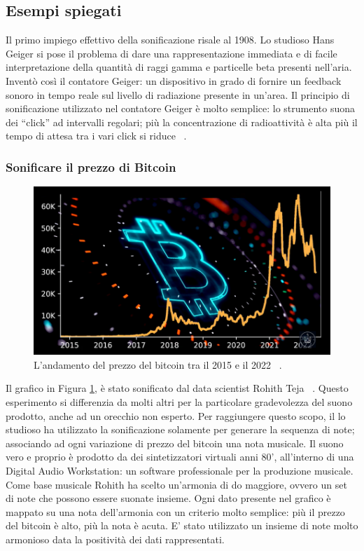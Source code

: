 \subsection{Esempi spiegati}
Il primo impiego effettivo della sonificazione risale al 1908. Lo studioso Hans Geiger si pose il problema di dare una rappresentazione immediata e di facile interpretazione della quantità di raggi gamma e particelle beta presenti nell’aria.
Inventò così il contatore Geiger: un dispositivo in grado di fornire un feedback sonoro in tempo reale sul livello di radiazione presente in un’area.
Il principio di sonificazione utilizzato nel contatore Geiger è molto semplice: lo strumento suona dei “click” ad intervalli regolari; più la concentrazione di radioattività è alta più il tempo di attesa tra i vari click si riduce ~\cite{soni_temporal}.

\subsubsection{Sonificare il prezzo di Bitcoin}
\begin{figure}[H]
  \includegraphics[width=\linewidth]{img/btc.PNG}
  \caption{L'andamento del prezzo del bitcoin tra il 2015 e il 2022 ~\cite{bitcoin}.}
  \label{fig:btc}
\end{figure}
Il grafico in Figura \ref{fig:btc}, è stato sonificato dal data scientist Rohith Teja  ~\cite{bitcoin}.
Questo esperimento si differenzia da molti altri per la particolare gradevolezza del suono prodotto, anche ad un orecchio non esperto.
Per raggiungere questo scopo, il lo studioso ha utilizzato la sonificazione solamente per generare la sequenza di note; associando ad ogni variazione di prezzo del bitcoin una nota musicale.
Il suono vero e proprio è prodotto da dei sintetizzatori virtuali anni 80', all'interno di una Digital Audio Workstation: un software professionale per la produzione musicale.
Come base musicale Rohith ha scelto un'armonia di do maggiore, ovvero un set di note che possono essere suonate insieme.
Ogni dato presente nel grafico è mappato su una nota dell'armonia con un criterio molto semplice: più il prezzo del bitcoin è alto, più la nota è acuta.
E' stato utilizzato un insieme di note molto armonioso data la positività dei dati rappresentati.
\\\\


